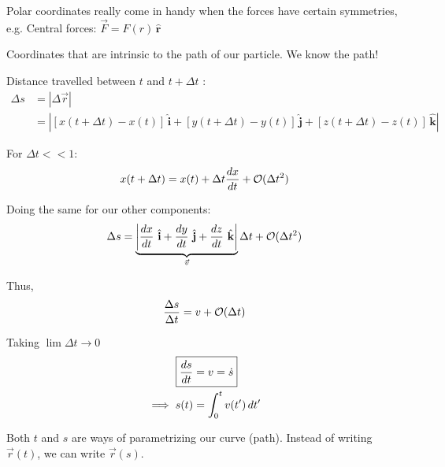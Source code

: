\documentclass[twoside]{scrartcl}
\let\oldhat\hat
\renewcommand{\hat}[1]{\,\oldhat{\boldsymbol{\mathbf{#1}}}}
\begin{document}
Polar coordinates really come in handy when the forces have certain symmetries, e.g. Central forces: $\vec{F} = F(r)\hat{r}$







\pagebreak



Coordinates 
 that are intrinsic to the path of our particle. We know the path!
 
\begin{center}
\end{center}

Distance travelled between $t$ and $t + \Delta t$
:
\[\begin{aligned}\Delta s &= |\Delta \vec{r}|\\
& = \left|[x(t + \Delta t) - x(t)]\hat{i} + [y(t + \Delta t) - y(t)]\hat{j} + [z(t + \Delta t) - z(t)]\hat{k}\right|	
\end{aligned}
\]

For $\Delta t << 1$: 
\[x(t + \Delta t) = x(t) + \Delta t \frac{dx}{dt} + \cal{O}(\Delta t^2)\]

Doing the same for our other components:
\[\Delta s = \underbrace{\left|\frac{dx}{dt}\hat{i} + \frac{dy}{dt}\hat{j} + \frac{dz}{dt}\hat{k}\right|}_{\vec{v}}\Delta t + \cal{O}(\Delta t^2)\]

Thus,
\[\frac{\Delta s}{\Delta t} = v + \cal{O}(\Delta t)\]

Taking $\lim \Delta t \to 0$
\[\begin{aligned}\Aboxed{\frac{ds}{dt} &= v = \dot{s}}\\ 
\implies s(t) &= \int_0^t v(t')\,dt'	
\end{aligned}
\]

Both $t$ and $s$ are ways of parametrizing our curve (path). Instead of writing $\vec{r}(t)$, we can write $\vec{r}(s)$. \\
\end{document}
